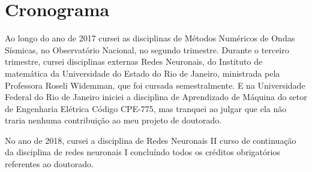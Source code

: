 \chapter{Cronograma}

Ao longo do ano de 2017 cursei as disciplinas de Métodos Numéricos de Ondas Sísmicas, no Observatório Nacional, no segundo trimestre. Durante o terceiro trimestre, cursei disciplinas externas Redes Neuronais, do Instituto de matemática da Universidade do Estado do Rio de Janeiro, ministrada pela Professora Roseli Widemman, que foi cursada semestralmente. E na Universidade Federal do Rio de Janeiro iniciei a disciplina de Aprendizado de Máquina do setor de Engenharia Elétrica Código CPE-775, mas tranquei ao julgar que ela não traria nenhuma contribuição ao meu projeto de doutorado.

No ano de 2018, cursei a disciplina de Redes Neuronais II curso de continuação da disciplina de redes neuronais I concluíndo todos os créditos obrigatórios referentes ao doutorado. 


